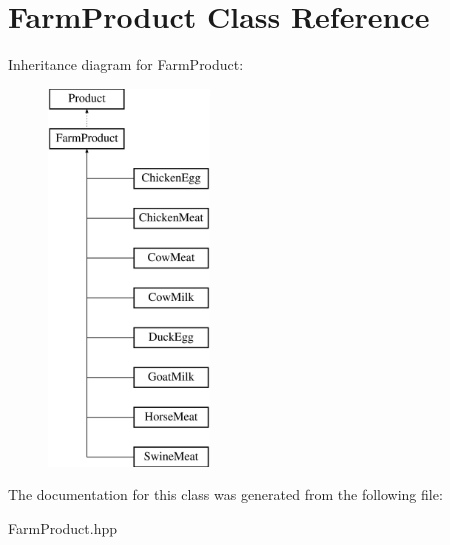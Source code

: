 \hypertarget{class_farm_product}{}\section{Farm\+Product Class Reference}
\label{class_farm_product}
Inheritance diagram for Farm\+Product\+:\begin{figure}[H]
\begin{center}
\leavevmode
\includegraphics[height=10.000000cm]{class_farm_product}
\end{center}
\end{figure}


The documentation for this class was generated from the following file\+:\begin{DoxyCompactItemize}
\item 
Farm\+Product.\+hpp\end{DoxyCompactItemize}

